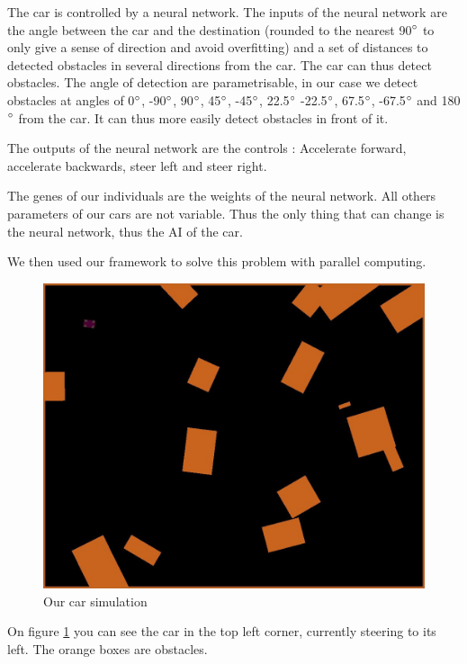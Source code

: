 \documentclass{acm_proc_article-sp}
\begin{document}
The car is controlled by a neural network. The inputs of the neural network are the angle between the car and the destination (rounded to the nearest 90$\degree$ to only give a sense of direction and avoid overfitting) and a set of distances to detected obstacles in several directions from the car. The car can thus detect obstacles.
The angle of detection are parametrisable, in our case we detect obstacles at angles of 0$\degree$, -90$\degree$, 90$\degree$, 45$\degree$, -45$\degree$, 22.5$\degree$ -22.5$\degree$, 67.5$\degree$, -67.5$\degree$ and 180$\degree$ from the car. It can thus more easily detect obstacles in front of it.

The outputs of the neural network are the controls : Accelerate forward, accelerate backwards, steer left and steer right.

The genes of our individuals are the weights of the neural network. All others parameters of our cars are not variable. Thus the only thing that can change is the neural network, thus the AI of the car.

We then used our framework to solve this problem with parallel computing.

\begin{figure}[!htbp]
\centering
\includegraphics[width=\linewidth]{./images/cars.jpg}
\caption{Our car simulation}
\label{fig1}
\end{figure}

On figure \ref{fig1} you can see the car in the top left corner, currently steering to its left. The orange boxes are obstacles.
\end{document}
